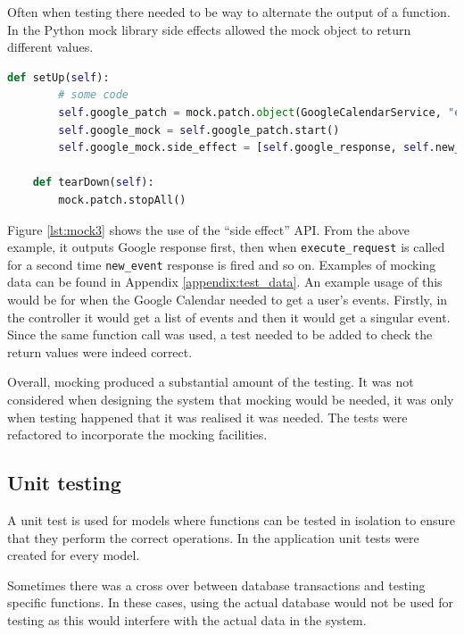Often when testing there needed to be way to alternate the output of a function. In the Python mock library side effects allowed the mock object to return different values.

\begin{lstlisting}[language=python, label={lst:mock3}, breaklines, columns=fullflexible, keywordstyle=\color{blue}, basicstyle=\normalsize\ttfamily]
    def setUp(self):
        # some code
        self.google_patch = mock.patch.object(GoogleCalendarService, "execute_request")
        self.google_mock = self.google_patch.start()
        self.google_mock.side_effect = [self.google_response, self.new_event, self.google_response, self.updated_response]

    def tearDown(self):
        mock.patch.stopAll()
\end{lstlisting}

Figure \ref{lst:mock3} shows the use of the ``side effect'' API. From the above example, it outputs Google response first, then when \lstinline[basicstyle=\normalsize\ttfamily]{execute_request} is called for a second time \lstinline[basicstyle=\normalsize\ttfamily]{new_event} response is fired and so on. Examples of mocking data can be found in Appendix \ref{appendix:test_data}. An example usage of this would be for when the Google Calendar needed to get a user's events. Firstly, in the controller it would get a list of events and then it would get a singular event. Since the same function call was used, a test needed to be added to check the return values were indeed correct.

Overall, mocking produced a substantial amount of the testing. It was not considered when designing the system that mocking would be needed, it was only when testing happened that it was realised it was needed. The tests were refactored to incorporate the mocking facilities.

\subsection{Unit testing}
A unit test is used for models where functions can be tested in isolation to ensure that they perform the correct operations. In the application unit tests were created for every model.

Sometimes there was a cross over between database transactions and testing specific functions. In these cases, using the actual database would not be used for testing as this would interfere with the actual data in the system.

